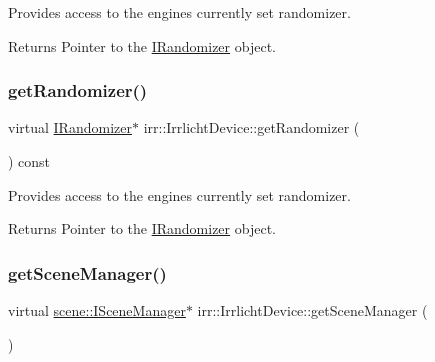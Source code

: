 Provides access to the engine\textquotesingle{}s currently set randomizer. 

\begin{DoxyReturn}{Returns}
Pointer to the \hyperlink{classirr_1_1IRandomizer}{I\+Randomizer} object. 
\end{DoxyReturn}
\mbox{\label{classirr_1_1IrrlichtDevice_aaba0cb18cac48e381d841ad763c7ea8b}} 
\subsubsection{\texorpdfstring{get\+Randomizer()}{getRandomizer()}\hspace{0.1cm}{\footnotesize\ttfamily [2/2]}}
{\footnotesize\ttfamily virtual \hyperlink{classirr_1_1IRandomizer}{I\+Randomizer}$\ast$ irr\+::\+Irrlicht\+Device\+::get\+Randomizer (\begin{DoxyParamCaption}{ }\end{DoxyParamCaption}) const\hspace{0.3cm}{\ttfamily [pure virtual]}}



Provides access to the engine\textquotesingle{}s currently set randomizer. 

\begin{DoxyReturn}{Returns}
Pointer to the \hyperlink{classirr_1_1IRandomizer}{I\+Randomizer} object. 
\end{DoxyReturn}
\mbox{\label{classirr_1_1IrrlichtDevice_a891b503ff4d5041296d88f23f97d7b3d}} 
\subsubsection{\texorpdfstring{get\+Scene\+Manager()}{getSceneManager()}\hspace{0.1cm}{\footnotesize\ttfamily [1/2]}}
{\footnotesize\ttfamily virtual \hyperlink{classirr_1_1scene_1_1ISceneManager}{scene\+::\+I\+Scene\+Manager}$\ast$ irr\+::\+Irrlicht\+Device\+::get\+Scene\+Manager (\begin{DoxyParamCaption}{ }\end{DoxyParamCaption})\hspace{0.3cm}{\ttfamily [pure virtual]}}



